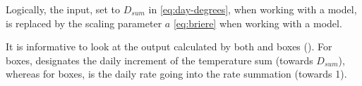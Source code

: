 Logically, the  input, set to $D_{sum}$ in \cref{eq:day-degrees}, when working with a  model, is replaced by the  scaling parameter $a$ \cref{eq:briere} when working with a  model.

It is informative to look at the output  calculated by both  and  boxes (). For  boxes,  designates the daily increment of the temperature sum (towards $D_{sum}$), whereas for  boxes,  is the daily rate going into the rate summation (towards 1).